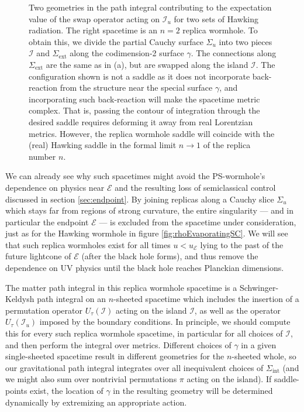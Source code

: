 \documentclass[letterpaper,12pt]{article}
\newcommand*{\scri}{\mathscr{I}} %
\newcommand*{\evap}{\mathscr{E}} %
\newcommand*{\island}{\mathcal{I}}
\begin{document}
\begin{figure}
\begin{subfigure}[t]{.49\textwidth}
\end{subfigure}
\caption{Two geometries in the path integral contributing to the expectation value of the swap operator acting on $\scri_u$ for two sets of Hawking radiation. The right spacetime is an $n=2$ replica wormhole. To obtain this, we divide the partial Cauchy surface $\Sigma_u$ into two pieces $\island$ and $\Sigma_\mathrm{ext}$ along the codimension-2 surface $\gamma$.  The connections along $\Sigma_\mathrm{ext}$ are the same as in (a), but are swapped along the island $\island$. The configuration shown is not a saddle as it does not incorporate back-reaction from the structure near the special surface $\gamma$, and incorporating such back-reaction will make the spacetime metric complex. That is, passing the contour of integration through the desired saddle requires deforming it away from real Lorentzian metrics.  However, the replica wormhole saddle will coincide with the (real) Hawking saddle in the formal limit $n\rightarrow 1$ of the replica number $n$.\label{fig:replicarho2}}
\end{figure}
%

We can already see why such spacetimes might avoid the PS-wormhole's dependence on physics near $\evap$ and the resulting loss of semiclassical control discussed in section \ref{sec:endpoint}.  By joining replicas along a Cauchy slice $\Sigma_u$ which stays far from regions of strong curvature, the entire singularity --- and in particular the endpoint $\evap$ --- is excluded from the spacetime under consideration, just as for the Hawking wormhole in figure \ref{fig:rhoEvaporatingSC}. We will see that such replica wormholes exist for all times $u<u_\evap$ lying to the past of the future lightcone of $\evap$ (after the black hole forms), and thus remove the dependence on UV physics until the black hole reaches Planckian dimensions.

The matter path integral in this replica wormhole spacetime is a Schwinger-Keldysh path integral on an $n$-sheeted spacetime which includes the insertion of a permutation operator $U_\tau(\island)$ acting on the island $\island$, as well as the operator $U_\tau(\scri_u)$ imposed by the boundary conditions. In principle, we should compute this for every such replica wormhole spacetime, in particular for all choices of $\island$, and then perform the integral over metrics. Different choices of $\gamma$ in a given single-sheeted spacetime result in different geometries for the $n$-sheeted whole, so our gravitational path integral integrates over all inequivalent choices of $\Sigma_\mathrm{int}$ (and we might also sum over nontrivial permutations $\pi$ acting on the island).  If saddle-points exist, the location of $\gamma$ in the resulting geometry will be determined dynamically by extremizing an appropriate action.
\end{document}
